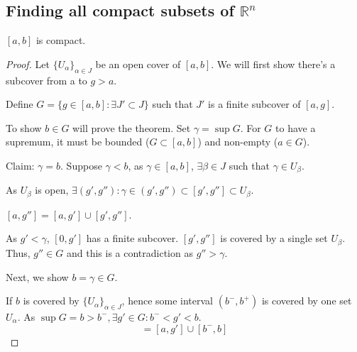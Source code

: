 \documentclass[a4paper]{article}
\numberwithin{equation}{section}
\newcommand{\R}{\mathbb{R}}
\begin{document}
\subsection{Finding all compact subsets of $\R^n$}
\begin{theorem}
    $[a,b]$ is compact.
    \begin{proof}
        Let $\{U_\alpha\}_{\alpha\in J}$ be an open cover of $[a,b]$. We will first show there's a subcover from a to $g>a$.

        \vspace{10pt}
        Define $G=\{g\in[a,b]: \exists J'\subset J\}$ such that $J'$ is a finite subcover of $[a,g]$.

        \vspace{10pt}
        To show $b\in G$ will prove the theorem. Set $\gamma=\sup G$. For $G$ to have a supremum, it must be bounded ($G\subset[a,b]$) and non-empty ($a\in G$). 

        \vspace{10pt}
        Claim: $\gamma=b$. Suppose $\gamma<b$, as $\gamma\in [a,b]$, $\exists\beta\in J$ such that $\gamma\in U_\beta$.

        \vspace{10pt}
        As $U_\beta$ is open, $\exists (g',g''): \gamma\in(g',g'')\subset[g',g'']\subset U_\beta$.

        \vspace{10pt}
        $[a,g'']=[a,g']\cup[g',g'']$.

        As $g'<\gamma$, $[0,g']$ has a finite subcover. $[g',g'']$ is covered by a single set $U_\beta$. Thus, $g''\in G$ and this is a contradiction as $g''>\gamma$.


        Next, we show $b=\gamma\in G$. 

        If $b$ is covered by $\{U_\alpha\}_{\alpha\in J}$, hence some interval $(b^-,b^+)$ is covered by one set $U_\alpha$. As $\sup G=b>b^-, \exists g'\in G: b^-<g'<b$.
        \begin{equation}
            [a,b]=[a,g']\cup[b^-,b]
        \end{equation}
    \end{proof}
\end{theorem}
\end{document}
